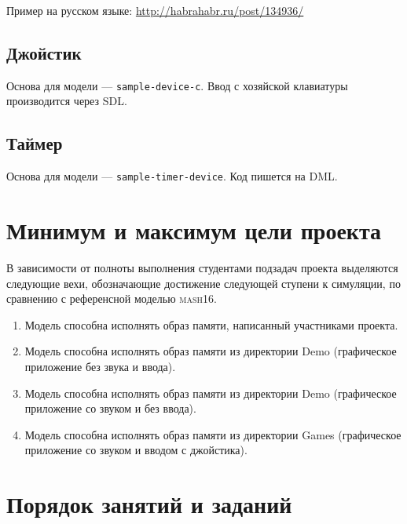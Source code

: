 Пример на русском языке: \url{http://habrahabr.ru/post/134936/}

\subsection{Джойстик}

Основа для модели --- \texttt{sample-device-c}. Ввод с хозяйской клавиатуры производится через SDL.

\subsection{Таймер}

Основа для модели --- \texttt{sample-timer-device}. Код пишется на DML.

\section{Минимум и максимум цели проекта}

В зависимости от полноты выполнения студентами подзадач проекта выделяются следующие вехи, обозначающие достижение следующей ступени к симуляции, по сравнению с референсной моделью \textsc{mash16}.

\begin{enumerate}
    \item Модель способна исполнять образ памяти, написанный участниками проекта.
    \item Модель способна исполнять образ памяти из директории Demo (графическое приложение без звука и ввода).
    \item Модель способна исполнять образ памяти из директории Demo (графическое приложение со звуком и без ввода).
    \item Модель способна исполнять образ памяти из директории Games (графическое приложение со звуком и вводом с джойстика).
\end{enumerate}

\section{Порядок занятий и заданий}

